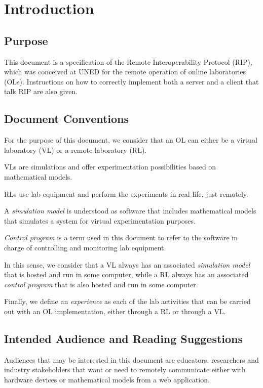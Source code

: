\chapter{Introduction}
\label{Introduction}

\section{Purpose}
This document is a specification of the Remote Interoperability Protocol (RIP), which was conceived at UNED for the remote operation of online laboratories (OLs). Instructions on how to correctly implement both a server and a client that talk RIP are also given.

\section{Document Conventions}
For the purpose of this document, we consider that an OL can either be a virtual laboratory (VL) or a remote laboratory (RL).

VLs are simulations and offer experimentation possibilities based on mathematical models.

RLs use lab equipment and perform the experiments in real life, just remotely.

A \textit{simulation model} is understood as software that includes mathematical models that simulates a system for virtual experimentation purposes.

\textit{Control program} is a term used in this document to refer to the software in charge of controlling and monitoring lab equipment.

In this sense, we consider that a VL always has an associated \textit{simulation model} that is hosted and run in some computer, while a RL always has an associated \textit{control program} that is also hosted and run in some computer.

Finally, we define an \textit{experience} as each of the lab activities that can be carried out with an OL implementation, either through a RL or through a VL.

\section{Intended Audience and Reading Suggestions}
Audiences that may be interested in this document are educators, researchers and industry stakeholders that want or need to remotely communicate either with hardware devices or mathematical models from a web application. 


